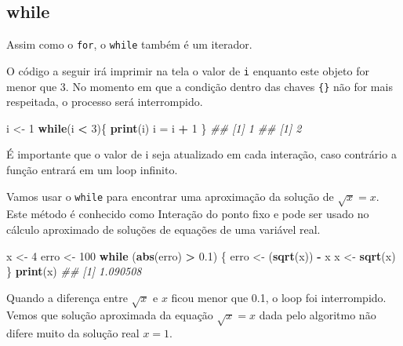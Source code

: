 \documentclass[]{book}
\newenvironment{Shaded}{\begin{snugshade}}{\end{snugshade}}
\newcommand{\CommentTok}[1]{\textcolor[rgb]{0.56,0.35,0.01}{\textit{#1}}}
\newcommand{\ControlFlowTok}[1]{\textcolor[rgb]{0.13,0.29,0.53}{\textbf{#1}}}
\newcommand{\DecValTok}[1]{\textcolor[rgb]{0.00,0.00,0.81}{#1}}
\newcommand{\FloatTok}[1]{\textcolor[rgb]{0.00,0.00,0.81}{#1}}
\newcommand{\KeywordTok}[1]{\textcolor[rgb]{0.13,0.29,0.53}{\textbf{#1}}}
\newcommand{\NormalTok}[1]{#1}
\newcommand{\OperatorTok}[1]{\textcolor[rgb]{0.81,0.36,0.00}{\textbf{#1}}}
\newcommand{\StringTok}[1]{\textcolor[rgb]{0.31,0.60,0.02}{#1}}
\begin{document}
\hypertarget{while}{%
\subsection{while}\label{while}}

Assim como o \texttt{for}, o \texttt{while} também é um iterador.

O código a seguir irá imprimir na tela o valor de \texttt{i} enquanto este objeto for menor que 3. No momento em que a condição dentro das chaves \texttt{\{\}} não for mais respeitada, o processo será interrompido.

\begin{Shaded}
\begin{Highlighting}[]
\NormalTok{i <-}\StringTok{ }\DecValTok{1}
\ControlFlowTok{while}\NormalTok{(i }\OperatorTok{<}\StringTok{ }\DecValTok{3}\NormalTok{)\{}
  \KeywordTok{print}\NormalTok{(i)}
\NormalTok{  i =}\StringTok{ }\NormalTok{i }\OperatorTok{+}\StringTok{ }\DecValTok{1}
\NormalTok{\}}
\CommentTok{## [1] 1}
\CommentTok{## [1] 2}
\end{Highlighting}
\end{Shaded}

É importante que o valor de i seja atualizado em cada interação, caso contrário a função entrará em um loop infinito.

Vamos usar o \texttt{while} para encontrar uma aproximação da solução de \(\sqrt{x} = x\). Este método é conhecido como Interação do ponto fixo e pode ser usado no cálculo aproximado de soluções de equações de uma variável real.

\begin{Shaded}
\begin{Highlighting}[]

\NormalTok{x <-}\StringTok{ }\DecValTok{4}
\NormalTok{erro <-}\StringTok{ }\DecValTok{100}
\ControlFlowTok{while}\NormalTok{ (}\KeywordTok{abs}\NormalTok{(erro) }\OperatorTok{>}\StringTok{ }\FloatTok{0.1}\NormalTok{) \{}
\NormalTok{  erro <-}\StringTok{ }\NormalTok{(}\KeywordTok{sqrt}\NormalTok{(x)) }\OperatorTok{-}\StringTok{ }\NormalTok{x}
\NormalTok{  x <-}\StringTok{ }\KeywordTok{sqrt}\NormalTok{(x)}
\NormalTok{\}}
\KeywordTok{print}\NormalTok{(x)}
\CommentTok{## [1] 1.090508}
\end{Highlighting}
\end{Shaded}

Quando a diferença entre \(\sqrt{x}\) e \(x\) ficou menor que 0.1, o loop foi interrompido.
Vemos que solução aproximada da equação \(\sqrt{x} = x\) dada pelo algoritmo não difere muito da solução real \(x=1\).
\end{document}
